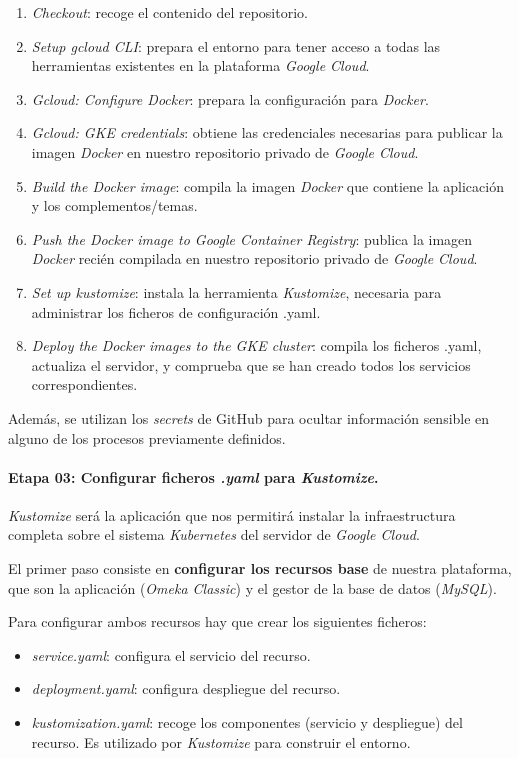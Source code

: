 \begin{enumerate}
\def\labelenumi{\arabic{enumi}.}
\tightlist
\item
  \emph{Checkout}: recoge el contenido del repositorio.
\item
  \emph{Setup gcloud CLI}: prepara el entorno para tener acceso a todas
  las herramientas existentes en la plataforma \emph{Google Cloud}.
\item
  \emph{Gcloud: Configure Docker}: prepara la configuración para
  \emph{Docker}.
\item
  \emph{Gcloud: GKE credentials}: obtiene las credenciales necesarias
  para publicar la imagen \emph{Docker} en nuestro repositorio privado
  de \emph{Google Cloud}.
\item
  \emph{Build the Docker image}: compila la imagen \emph{Docker} que
  contiene la aplicación y los complementos/temas.
\item
  \emph{Push the Docker image to Google Container Registry}: publica la
  imagen \emph{Docker} recién compilada en nuestro repositorio privado
  de \emph{Google Cloud}.
\item
  \emph{Set up kustomize}: instala la herramienta \emph{Kustomize},
  necesaria para administrar los ficheros de configuración .yaml.
\item
  \emph{Deploy the Docker images to the GKE cluster}: compila los
  ficheros .yaml, actualiza el servidor, y comprueba que se han creado
  todos los servicios correspondientes.
\end{enumerate}

Además, se utilizan los \emph{secrets} de GitHub para ocultar
información sensible en alguno de los procesos previamente definidos.

\paragraph{Etapa 03: Configurar ficheros \emph{.yaml} para \emph{Kustomize}.} 
\emph{Kustomize} será la aplicación que nos permitirá instalar la
infraestructura completa sobre el sistema \emph{Kubernetes} del servidor
de \emph{Google Cloud}.

El primer paso consiste en \textbf{configurar los recursos base} de
nuestra plataforma, que son la aplicación (\emph{Omeka Classic}) y el
gestor de la base de datos (\emph{MySQL}).

Para configurar ambos recursos hay que crear los siguientes ficheros:

\begin{itemize}
\tightlist
\item
  \emph{service.yaml}: configura el servicio del recurso.
\item
  \emph{deployment.yaml}: configura despliegue del recurso.
\item
  \emph{kustomization.yaml}: recoge los componentes (servicio y
  despliegue) del recurso. Es utilizado por \emph{Kustomize} para
  construir el entorno.
\end{itemize}


